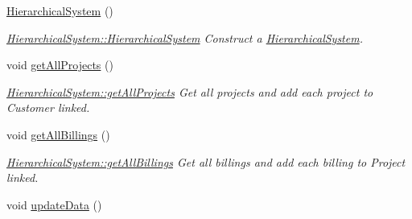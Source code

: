 \begin{DoxyCompactItemize}
\item 
\hypertarget{classUtils_1_1HierarchicalSystem_a55e085ac80ae1640b7fb428f2a5d188c}{\hyperlink{classUtils_1_1HierarchicalSystem_a55e085ac80ae1640b7fb428f2a5d188c}{Hierarchical\-System} ()}\label{classUtils_1_1HierarchicalSystem_a55e085ac80ae1640b7fb428f2a5d188c}

\begin{DoxyCompactList}\small\item\em \hyperlink{classUtils_1_1HierarchicalSystem_a55e085ac80ae1640b7fb428f2a5d188c}{Hierarchical\-System\-::\-Hierarchical\-System} Construct a \hyperlink{classUtils_1_1HierarchicalSystem}{Hierarchical\-System}. \end{DoxyCompactList}\item 
\hypertarget{classUtils_1_1HierarchicalSystem_ae45de757de5b0867d419a4d86e12c94f}{void \hyperlink{classUtils_1_1HierarchicalSystem_ae45de757de5b0867d419a4d86e12c94f}{get\-All\-Projects} ()}\label{classUtils_1_1HierarchicalSystem_ae45de757de5b0867d419a4d86e12c94f}

\begin{DoxyCompactList}\small\item\em \hyperlink{classUtils_1_1HierarchicalSystem_ae45de757de5b0867d419a4d86e12c94f}{Hierarchical\-System\-::get\-All\-Projects} Get all projects and add each project to Customer linked. \end{DoxyCompactList}\item 
\hypertarget{classUtils_1_1HierarchicalSystem_a80b20dd898e0c44741cb4e6768342b72}{void \hyperlink{classUtils_1_1HierarchicalSystem_a80b20dd898e0c44741cb4e6768342b72}{get\-All\-Billings} ()}\label{classUtils_1_1HierarchicalSystem_a80b20dd898e0c44741cb4e6768342b72}

\begin{DoxyCompactList}\small\item\em \hyperlink{classUtils_1_1HierarchicalSystem_a80b20dd898e0c44741cb4e6768342b72}{Hierarchical\-System\-::get\-All\-Billings} Get all billings and add each billing to Project linked. \end{DoxyCompactList}\item 
\hypertarget{classUtils_1_1HierarchicalSystem_af0881e95aef001ee46d9f83a9e66dca5}{void \hyperlink{classUtils_1_1HierarchicalSystem_af0881e95aef001ee46d9f83a9e66dca5}{update\-Data} ()}\label{classUtils_1_1HierarchicalSystem_af0881e95aef001ee46d9f83a9e66dca5}


\end{DoxyCompactItemize}
